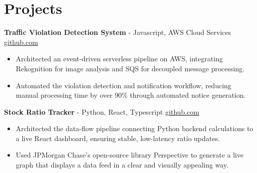 \documentclass[11pt]{article}       %
\begin{document}

\vspace{-18.5pt}

\section*{Projects}

\textbf{Traffic Violation Detection System}{ - Javascript, AWS Cloud Services} \hfill \href{https://github.com/Monica20030707/AWS_rekonigition-N-read-database}{github.com} \\
\vspace{-9pt}
\begin{itemize}
  \item Architected an event-driven serverless pipeline on AWS, integrating Rekognition for image analysis and SQS for decoupled message processing.
  \item Automated the violation detection and notification workflow, reducing manual processing time by over 90\% through automated notice generation.
\end{itemize}

\textbf{Stock Ratio Tracker}{ - Python, React, Typescript} \hfill \href{https://github.com/Monica20030707/tradingDashboard-UI}{github.com} \\
\vspace{-9pt}
\begin{itemize}
  \item Architected the data-flow pipeline connecting Python backend calculations to a live React dashboard, ensuring stable, low-latency ratio updates. 
  \item Used JPMorgan Chase’s open-source library Perspective to generate a live graph that displays a data feed in a clear and visually appealing way.
\end{itemize}
\end{document}
